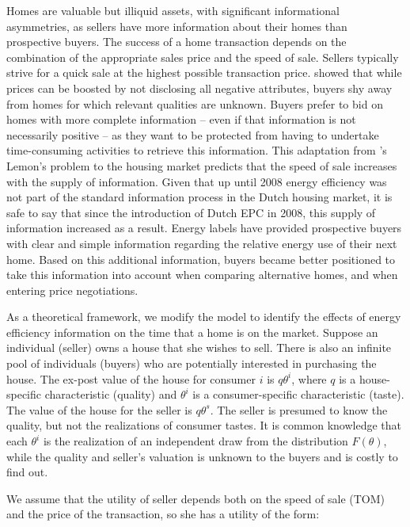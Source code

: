 \documentclass[12pt]{article}
\begin{document}
Homes are valuable but illiquid assets, with significant informational asymmetries, as sellers have more information about their homes than prospective buyers. The success of a home transaction depends on the combination of the appropriate sales price and the  speed of sale. Sellers typically strive for a quick sale at the highest possible transaction price. \cite{taylor1999time} showed that while prices can be boosted by not disclosing all negative attributes, buyers shy away from homes for which relevant qualities are unknown. Buyers prefer to bid on homes with more complete information – even if that information is not necessarily positive – as they want to be protected from having to undertake time-consuming activities to retrieve this information. This adaptation from \cite{akerlof1970vthe}'s Lemon's problem to the housing market predicts that the speed of sale increases with the supply of information. Given that up until 2008 energy efficiency was not part of the standard information process in the Dutch housing market, it is safe to say that since the introduction of Dutch EPC in 2008, this supply of information increased as a result. Energy labels have provided prospective buyers with clear and simple information regarding the relative energy use of their next home. Based on this additional information, buyers became better positioned to take this information into account when comparing alternative homes, and when entering price negotiations.   

As a theoretical framework, we modify the \cite{taylor1999time} model to identify the effects of energy efficiency information on the time that a home is on the market. Suppose an individual (seller) owns a house that she wishes to sell. There is also an infinite pool of individuals (buyers) who are potentially interested in purchasing the house. The ex-post value of the house for consumer $i$ is $q \theta^i$, where $q$ is a house-specific characteristic (quality) and $\theta^i$ is a consumer-specific characteristic (taste). The value of the house for the seller is  $q \theta^s$. The seller is presumed to know the quality, but not the realizations of consumer tastes. It is common knowledge that each $\theta^i$ is the realization of an independent draw from the distribution $F(\theta)$, while the quality and seller's valuation is unknown to the buyers and is costly to find out. 

We assume that the utility of seller depends both on the speed of sale (TOM) and the price of the transaction, so she has a utility of the form:
\end{document}
